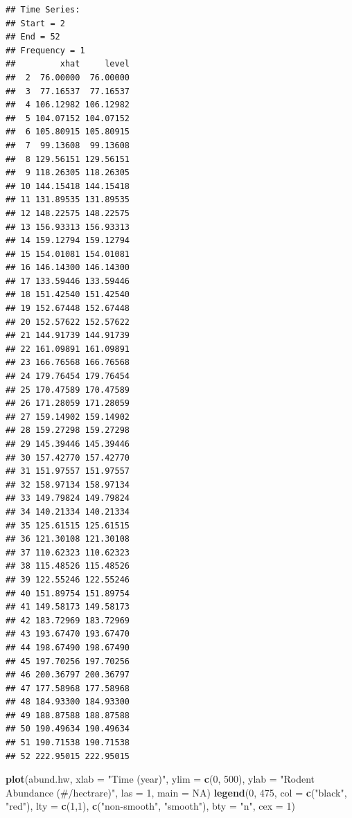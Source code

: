 \documentclass[]{article}
\newenvironment{Shaded}{\begin{snugshade}}{\end{snugshade}}
\newcommand{\KeywordTok}[1]{\textcolor[rgb]{0.13,0.29,0.53}{\textbf{{#1}}}}
\newcommand{\DataTypeTok}[1]{\textcolor[rgb]{0.13,0.29,0.53}{{#1}}}
\newcommand{\DecValTok}[1]{\textcolor[rgb]{0.00,0.00,0.81}{{#1}}}
\newcommand{\StringTok}[1]{\textcolor[rgb]{0.31,0.60,0.02}{{#1}}}
\newcommand{\OtherTok}[1]{\textcolor[rgb]{0.56,0.35,0.01}{{#1}}}
\newcommand{\NormalTok}[1]{{#1}}
\begin{document}
\begin{verbatim}
## Time Series:
## Start = 2 
## End = 52 
## Frequency = 1 
##         xhat     level
##  2  76.00000  76.00000
##  3  77.16537  77.16537
##  4 106.12982 106.12982
##  5 104.07152 104.07152
##  6 105.80915 105.80915
##  7  99.13608  99.13608
##  8 129.56151 129.56151
##  9 118.26305 118.26305
## 10 144.15418 144.15418
## 11 131.89535 131.89535
## 12 148.22575 148.22575
## 13 156.93313 156.93313
## 14 159.12794 159.12794
## 15 154.01081 154.01081
## 16 146.14300 146.14300
## 17 133.59446 133.59446
## 18 151.42540 151.42540
## 19 152.67448 152.67448
## 20 152.57622 152.57622
## 21 144.91739 144.91739
## 22 161.09891 161.09891
## 23 166.76568 166.76568
## 24 179.76454 179.76454
## 25 170.47589 170.47589
## 26 171.28059 171.28059
## 27 159.14902 159.14902
## 28 159.27298 159.27298
## 29 145.39446 145.39446
## 30 157.42770 157.42770
## 31 151.97557 151.97557
## 32 158.97134 158.97134
## 33 149.79824 149.79824
## 34 140.21334 140.21334
## 35 125.61515 125.61515
## 36 121.30108 121.30108
## 37 110.62323 110.62323
## 38 115.48526 115.48526
## 39 122.55246 122.55246
## 40 151.89754 151.89754
## 41 149.58173 149.58173
## 42 183.72969 183.72969
## 43 193.67470 193.67470
## 44 198.67490 198.67490
## 45 197.70256 197.70256
## 46 200.36797 200.36797
## 47 177.58968 177.58968
## 48 184.93300 184.93300
## 49 188.87588 188.87588
## 50 190.49634 190.49634
## 51 190.71538 190.71538
## 52 222.95015 222.95015
\end{verbatim}

\begin{Shaded}
\begin{Highlighting}[]
\KeywordTok{plot}\NormalTok{(abund.hw, }\DataTypeTok{xlab =} \StringTok{"Time (year)"}\NormalTok{, }\DataTypeTok{ylim =} \KeywordTok{c}\NormalTok{(}\DecValTok{0}\NormalTok{, }\DecValTok{500}\NormalTok{),}
\DataTypeTok{ylab =} \StringTok{"Rodent Abundance (#/hectrare)"}\NormalTok{, }\DataTypeTok{las =} \DecValTok{1}\NormalTok{, }\DataTypeTok{main =} \OtherTok{NA}\NormalTok{) }
\KeywordTok{legend}\NormalTok{(}\DecValTok{0}\NormalTok{, }\DecValTok{475}\NormalTok{, }\DataTypeTok{col =} \KeywordTok{c}\NormalTok{(}\StringTok{"black"}\NormalTok{, }\StringTok{"red"}\NormalTok{), }\DataTypeTok{lty =} \KeywordTok{c}\NormalTok{(}\DecValTok{1}\NormalTok{,}\DecValTok{1}\NormalTok{), }\KeywordTok{c}\NormalTok{(}\StringTok{"non-smooth"}\NormalTok{, }\StringTok{"smooth"}\NormalTok{), }\DataTypeTok{bty =} \StringTok{"n"}\NormalTok{, }\DataTypeTok{cex =} \DecValTok{1}\NormalTok{)}
\end{Highlighting}
\end{Shaded}
\end{document}
